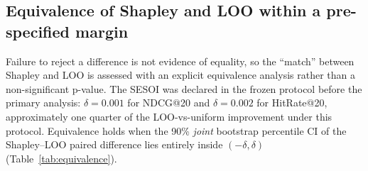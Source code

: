 \documentclass[pdflatex,sn-mathphys-num]{sn-jnl}
\begin{document}
\begin{table}[t]
\caption{Cost-effectiveness over five seeds. Attribution seconds report the five-seed total followed by per-seed mean $\pm$ SD in parentheses; training is excluded. ``NDCG gain/hour'' = NDCG@20 gain \emph{relative to uniform reweighting} divided by the five-seed total attribution time (one-time offline cost; serving-time reranking and per-user update costs are not profiled). The retained ML-1M Shapley outlier inflates the mean; the median/IQR are reported in the text.}\label{tab:cost}
\centering
\small
{}
\end{table}


\subsection{Equivalence of Shapley and LOO within a pre-specified margin}\label{subsec:equivalence}

Failure to reject a difference is not evidence of equality, so the ``match'' between Shapley and LOO is assessed with an explicit equivalence analysis rather than a non-significant p-value. The SESOI was declared in the frozen protocol before the primary analysis: $\delta=0.001$ for NDCG@20 and $\delta=0.002$ for HitRate@20, approximately one quarter of the LOO-vs-uniform improvement under this protocol. Equivalence holds when the 90\% \emph{joint} bootstrap percentile CI of the Shapley--LOO paired difference lies entirely inside $(-\delta,\delta)$ (Table~\ref{tab:equivalence}).
\end{document}
